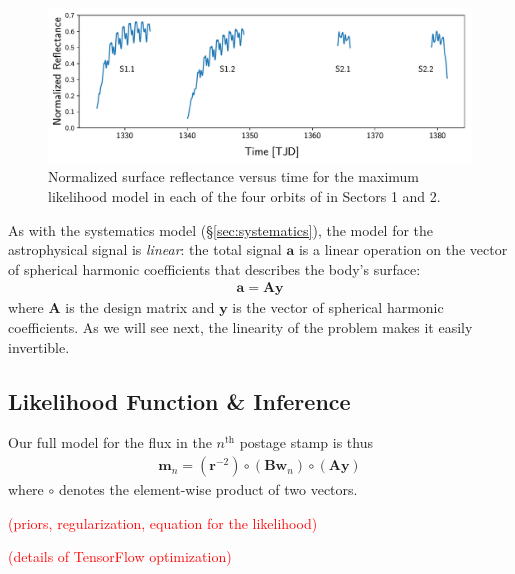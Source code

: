 \documentclass[modern]{aastex62}
\newcommand{\todo}[1]{\textcolor{red}{#1}}
\begin{document}
\begin{figure}[ht!]
    \begin{centering}
    \includegraphics[width=\linewidth]{figures/starry_model.pdf}
    \caption{\label{fig:starry_model}
             Normalized surface reflectance versus time for the maximum
             likelihood \starry model in each of the four orbits of \tess
             in Sectors 1 and 2.
             }
    \end{centering}
\end{figure}

As with the systematics model (\S\ref{sec:systematics}), the model
for the astrophysical signal is \emph{linear}: the total signal $\mathbf{a}$ 
is a linear operation on the vector of spherical harmonic coefficients 
that describes the body's surface:
%
\begin{align}
    \mathbf{a} = \mathbf{A} \mathbf{y}
\end{align}
%
where $\mathbf{A}$ is the design matrix \citep[equal to the quantity 
$\mathbf{s}^\top\mathcal{A}\mathbf{R}'\mathbf{R}$ in][]{Luger2019}
and $\mathbf{y}$ is the vector of spherical harmonic coefficients. As we will
see next, the linearity of the problem makes it easily invertible.

\subsection{Likelihood Function \& Inference}

Our full model for the flux in the $n^\mathrm{th}$ postage stamp is thus
%
\begin{align}
\mathbf{m}_n = (\mathbf{r}^{-2}) \circ (\mathbf{B} \mathbf{w}_n) \circ (\mathbf{A} \mathbf{y})
\end{align}
%
where $\circ$ denotes the element-wise product of two vectors.

\todo{(priors, regularization, equation for the likelihood)}

\todo{(details of TensorFlow optimization)}
\end{document}
